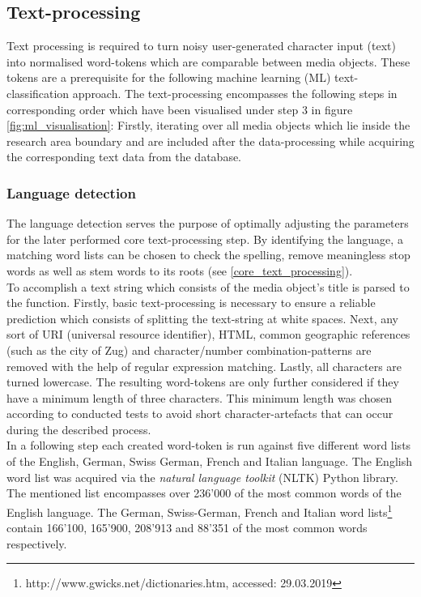 \subsection{Text-processing} \label{text_processing}
Text processing is required to turn noisy user-generated character input (text) into normalised word-tokens which are comparable between media objects. These tokens are a prerequisite for the following machine learning (ML) text-classification approach. The text-processing encompasses the following steps in corresponding order which have been visualised under step 3 in figure \ref{fig:ml_visualisation}: Firstly, iterating over all media objects which lie inside the research area boundary and are included after the data-processing while acquiring the corresponding text data from the database.

\subsubsection{Language detection} \label{language_detection}
The language detection serves the purpose of optimally adjusting the parameters for the later performed core text-processing step. By identifying the language, a matching word lists can be chosen to check the spelling, remove meaningless stop words as well as stem words to its roots (see \ref{core_text_processing}).\\
To accomplish a text string which consists of the media object's title is parsed to the function. Firstly, basic text-processing is necessary to ensure a reliable prediction which consists of splitting the text-string at white spaces. Next, any sort of URI (universal resource identifier), HTML, common geographic references (such as the city of Zug) and character/number combination-patterns are removed with the help of regular expression matching. Lastly, all characters are turned lowercase. The resulting word-tokens are only further considered if they have a minimum length of three characters. This minimum length was chosen according to conducted tests to avoid short character-artefacts that can occur during the described process.\\
In a following step each created word-token is run against five different word lists of the English, German, Swiss German, French and Italian language.
The English word list was acquired via the \textit{natural language toolkit} (NLTK) Python library. The mentioned list encompasses over 236'000 of the most common words of the English language.
The German, Swiss-German, French and Italian word lists\footnote{http://www.gwicks.net/dictionaries.htm, accessed: 29.03.2019} contain 166'100, 165'900, 208'913 and 88'351 of the most common words respectively.\\
